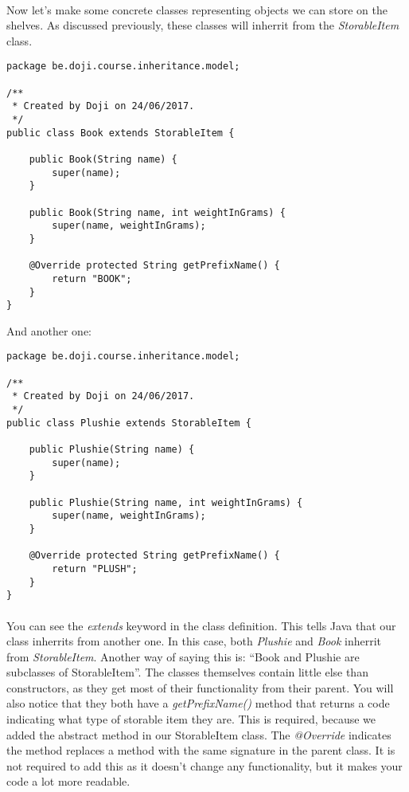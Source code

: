 \documentclass[11pt,fleqn]{book} %
\begin{document}
\paragraph{}Now let's make some concrete classes representing objects we can store on the shelves. As discussed previously, these classes will inherrit from the \emph{StorableItem} class.

\begin{lstlisting}[caption=Book.java]
package be.doji.course.inheritance.model;

/**
 * Created by Doji on 24/06/2017.
 */
public class Book extends StorableItem {

    public Book(String name) {
        super(name);
    }

    public Book(String name, int weightInGrams) {
        super(name, weightInGrams);
    }

    @Override protected String getPrefixName() {
        return "BOOK";
    }
}
\end{lstlisting}
And another one:
\begin{lstlisting}[caption=Plushie.java]
package be.doji.course.inheritance.model;

/**
 * Created by Doji on 24/06/2017.
 */
public class Plushie extends StorableItem {

    public Plushie(String name) {
        super(name);
    }

    public Plushie(String name, int weightInGrams) {
        super(name, weightInGrams);
    }

    @Override protected String getPrefixName() {
        return "PLUSH";
    }
}
\end{lstlisting}

\paragraph{}You can see the \emph{extends} keyword in the class definition. This tells Java that our class inherrits from another one. In this case, both \emph{Plushie} and \emph{Book} inherrit from \emph{StorableItem}. Another way of saying this is: ``Book and Plushie are subclasses of StorableItem''. The classes themselves contain little else than constructors, as they get most of their functionality from their parent.
You will also notice that they both have a \emph{getPrefixName()} method that returns a code indicating what type of storable item they are. This is required, because we added the abstract method in our StorableItem class.
The \emph{@Override} indicates the method replaces a method with the same signature in the parent class. It is not required to add this as it doesn't change any functionality, but it makes your code a lot more readable.
\end{document}
